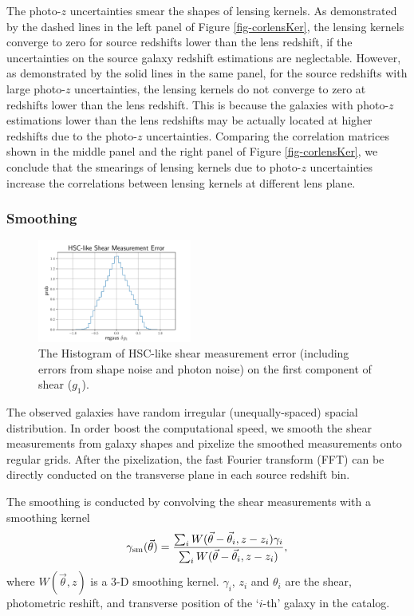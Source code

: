 \documentclass[twocolumn]{aastex62}
\begin{document}
The photo-$z$ uncertainties smear the shapes of lensing kernels. As demonstrated by the dashed lines in the left panel of 
Figure \ref{fig-corlensKer}, the lensing kernels converge to zero for source redshifts lower than the lens redshift, if the 
uncertainties on the source galaxy redshift estimations are neglectable. However, as demonstrated by the solid lines in the 
same panel, for the source redshifts with large photo-$z$ uncertainties, the lensing kernels do not converge to zero at 
redshifts lower than the lens redshift. This is because the galaxies with photo-$z$ estimations lower than the lens redshifts 
may be actually located at higher redshifts due to the photo-$z$ uncertainties.
Comparing the correlation matrices shown in the middle panel and the right panel of Figure \ref{fig-corlensKer}, we conclude 
that the smearings of lensing kernels due to photo-$z$ uncertainties increase the correlations between lensing kernels at 
different lens plane.

\subsubsection{Smoothing}
\label{subsec:method-smoothing}

\begin{figure}[!t]
 \centering
 \includegraphics[width=0.45\textwidth]{shapeMeasurementError-HSCY1.pdf}
 \caption{The Histogram of HSC-like shear measurement error (including errors from shape noise and photon noise) on the 
        first component of shear ($g_1$).}
 \label{fig:mass-redshift}
\end{figure}

The observed galaxies have random irregular (unequally-spaced) spacial distribution. In order boost the computational
speed, we smooth the shear measurements from galaxy shapes and pixelize the smoothed measurements onto regular grids.
After the pixelization, the fast Fourier transform (FFT) can be directly conducted on the transverse plane in each 
source redshift bin.

The smoothing is conducted by convolving the shear measurements with a smoothing kernel
\begin{equation}
\gamma_{\rm{sm}} (\vec{\theta})  = \frac{\sum_i  W(\vec{\theta}-\vec{{\theta}}_i,z-z_i) \gamma_i}{\sum_i W(\vec{\theta}-\vec{{\theta}}_i,z-z_i) },
\end{equation}
where $W(\vec{\theta},z)$ is a $3$-D smoothing kernel. $\gamma_i$, $z_i$ and $\theta_i$ are the shear,
photometric reshift, and transverse position of the `$i$-th' galaxy in the catalog.
\end{document}
